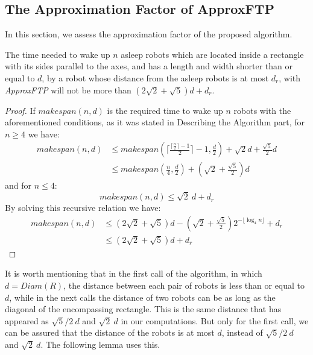 \documentclass{cccg12}
\begin{document}
\subsection{The Approximation Factor of ApproxFTP}
In this section, we assess the approximation factor of the proposed algorithm.

\begin{lemma}
\label{lem:1}
The time needed to wake up $n$ asleep robots which are located inside a rectangle with its sides parallel to the axes, and has a length and width shorter than or equal to $d$, by a robot whose distance from the asleep robots is at most $d_r$, with \textit{ApproxFTP} will not be more than ${ (2\sqrt{2}+\sqrt{5})d+d_r }$.
\end{lemma}
\begin{proof}
If ${ makespan(n,d) }$ is the required time to wake up $n$ robots with the aforementioned conditions, as it was stated in Describing the Algorithm part, for ${ n\geq 4 }$ we have:
{\small\begin{align}
makespan(n,d) &\leq makespan(\bigg\lceil \frac{\lceil\frac{n}{2}\rceil\!\!-\!1}{2} \bigg\rceil\!\!-\!1, \frac{d}{2})+\!\sqrt{2}d+\!\frac{\sqrt{5}}{2}d \nonumber\\
				&\leq makespan(\frac{n}{4}, \frac{d}{2})+(\sqrt{2}+\frac{\sqrt{5}}{2})d \nonumber
\end{align}}
and for ${ n\le 4 }$:
{\small$$ makespan(n,d) \leq \sqrt{2} ~d+d_r $$}
By solving this recursive relation we have:
{\small\begin{align}
makespan(n,d) &\leq (2\sqrt{2}+\!\sqrt{5})d-\!(\sqrt{2}+\!\frac{\sqrt{5}}{2}) 2^{-\!\lfloor\log_4n \rfloor}+d_r \nonumber\\
				&\leq (2\sqrt{2}+\!\sqrt{5})d+d_r \nonumber
\end{align}}
\end{proof}

It is worth mentioning that in the first call of the algorithm, in which ${ d=Diam(R) }$, the distance between each pair of robots is less than or equal to $d$, while in the next calls the distance of two robots can be as long as the diagonal of the encompassing rectangle. This is the same distance that has appeared as ${ \sqrt{5}/2~d }$ and ${ \sqrt{2}~d }$ in our computations. But only for the first call, we can be assured that the distance of the robots is at most $d$, instead of  ${ \sqrt{5}/2~d }$ and ${ \sqrt{2}~d }$. The following lemma uses this.
\end{document}
